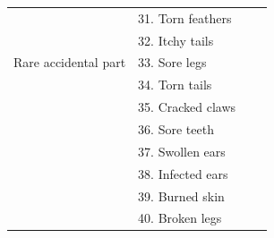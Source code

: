 \documentclass[10pt,letterpaper]{article}
\begin{document}
\begin{table}[h]
\begin{tabular}{| l || l | l | l |}
                                          & 31. Torn feathers                       &                &                     \\
                                          & 32. Itchy tails                      &                &                     \\  
Rare accidental part    & 33. Sore legs       &                &                     \\
                                          & 34. Torn tails                       &                &                     \\
                                          & 35. Cracked claws                         &                &                     \\
                                          & 36. Sore teeth                       &                &                     \\
                                          & 37. Swollen ears                      &                &                     \\
                                          & 38. Infected ears                    &                &                     \\
                                          & 39. Burned skin                       &                &                     \\
                                          & 40. Broken legs                     &                &                     \\                                                                                          
                                           \hline

\end{tabular}
\end{table}



\setlength{\bibleftmargin}{.125in}
\setlength{\bibindent}{-\bibleftmargin}


\end{document}
